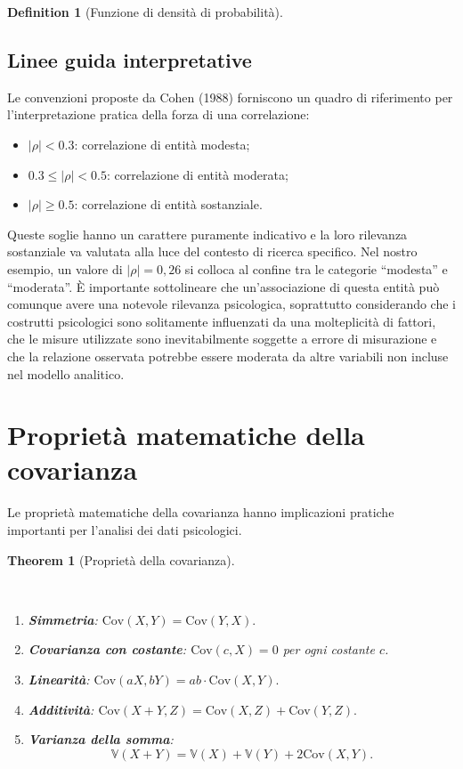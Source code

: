 \documentclass[
  letterpaper,
  DIV=11,
  numbers=noendperiod,
  oneside]{scrreprt}
\providecommand{\tightlist}{%
  \setlength{\itemsep}{0pt}\setlength{\parskip}{0pt}}
\theoremstyle{definition}
\theoremstyle{plain}
\newtheorem{theorem}{Theorem}[chapter]
\theoremstyle{definition}
\newtheorem{definition}{Definition}[chapter]
\theoremstyle{remark}
\begin{document}
\begin{definition}[Funzione di densità di
probabilità]
\subsection{Linee guida
interpretative}\label{linee-guida-interpretative}

Le convenzioni proposte da Cohen (1988) forniscono un quadro di
riferimento per l'interpretazione pratica della forza di una
correlazione:

\begin{itemize}
\tightlist
\item
  \(|\rho| < 0.3\): correlazione di entità modesta;
\item
  \(0.3 \leq |\rho| < 0.5\): correlazione di entità moderata;
\item
  \(|\rho| \geq 0.5\): correlazione di entità sostanziale.
\end{itemize}

Queste soglie hanno un carattere puramente indicativo e la loro
rilevanza sostanziale va valutata alla luce del contesto di ricerca
specifico. Nel nostro esempio, un valore di \(|\rho| = 0,26\) si colloca
al confine tra le categorie ``modesta'' e ``moderata''. È importante
sottolineare che un'associazione di questa entità può comunque avere una
notevole rilevanza psicologica, soprattutto considerando che i costrutti
psicologici sono solitamente influenzati da una molteplicità di fattori,
che le misure utilizzate sono inevitabilmente soggette a errore di
misurazione e che la relazione osservata potrebbe essere moderata da
altre variabili non incluse nel modello analitico.

\section{Proprietà matematiche della
covarianza}\label{proprietuxe0-matematiche-della-covarianza}

Le proprietà matematiche della covarianza hanno implicazioni pratiche
importanti per l'analisi dei dati psicologici.

\begin{theorem}[Proprietà della
covarianza]\protect\hypertarget{thm-cov-properties}{}\label{thm-cov-properties}

~

\begin{enumerate}
\def\labelenumi{\arabic{enumi}.}
\item
  \textbf{Simmetria}: \(\text{Cov}(X, Y) = \text{Cov}(Y, X).\)
\item
  \textbf{Covarianza con costante}: \(\text{Cov}(c, X) = 0\) per ogni
  costante \(c\).
\item
  \textbf{Linearità}:
  \(\text{Cov}(aX, bY) = ab \cdot \text{Cov}(X, Y).\)
\item
  \textbf{Additività}:
  \(\text{Cov}(X + Y, Z) = \text{Cov}(X, Z) + \text{Cov}(Y, Z).\)
\item
  \textbf{Varianza della somma}:
  \[\mathbb{V}(X + Y) = \mathbb{V}(X) + \mathbb{V}(Y) + 2\text{Cov}(X, Y).\]
\end{enumerate}


\end{theorem}
\end{definition}
\end{document}
